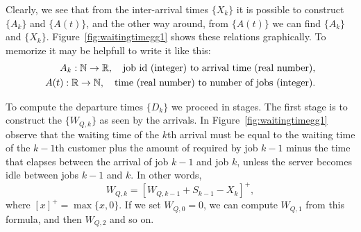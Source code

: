 Clearly, we see that from the inter-arrival times $\{X_k\}$ it is
possible to construct $\{A_k\}$ and $\{A(t)\}$, and the other way
around, from $\{A(t)\}$ we can find $\{A_k\}$ and $\{X_k\}$.
Figure~\ref{fig:waitingtimegg1} shows these relations graphically. To
memorize it may be helpfull to write it like this:
\begin{align*}
  A_k : \mathbb{N} \to \mathbb{R}, \quad{\text{job id (integer) to arrival time (real number)}}, \\
  A(t) : \mathbb{R}\to \mathbb{N}, \quad{\text{time (real number) to number of jobs (integer)}}.
\end{align*}

To compute the departure times $\{D_k\}$ we proceed in stages. The
first stage is to construct the 
$\{W_{Q,k}\}$ as seen by the arrivals. In
Figure~\ref{fig:waitingtimegg1} observe that the waiting time of the
$k$th arrival must be equal to the waiting time of the $k-1$th
customer plus the amount of  required by job
$k-1$ minus the time that elapses between the arrival of job $k-1$ and
job $k$, unless the server becomes idle between jobs $k-1$ and $k$.
In other words,
\begin{equation}\label{eq:56}
  W_{Q,k} = [W_{Q,k-1} + S_{k-1}-X_k]^+,
\end{equation}
where $[x]^+ = \max\{x, 0\}$. If we set $W_{Q,0}=0$, we can compute
$W_{Q,1}$ from this formula, and then $W_{Q,2}$ and so on.

